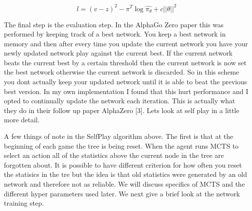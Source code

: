 \begin{equation}
    l = (v - z)^{2} - \pi^{T} \log{\hat{\pi_{\theta}}} + c||\theta||^{2}
\end{equation}

The final step is the evaluation step. In the AlphaGo Zero paper this was performed by keeping track of a best network. You keep a best network in memory and then after every time you update the current network you have your newly updated network play against the current best. If the current network beats the current best by a certain threshold then the current network is now set the best network otherwise the current network is discarded. So in this scheme you dont actually keep your updated network until it is able to beat the previous best version. In my own implementation I found that this hurt performance and I opted to continually update the network each iteration. This is actually what they do in their follow up paper AlphaZero [3]. Lets look at self play in a little more detail. 


\begin{algorithm}[H]
\SetAlgoLined
{}
\end{algorithm}


A few things of note in the SelfPlay algorithm above. The first is that at the beginning of each game the tree is being reset. When the agent runs MCTS to select an action all of the statistics above the current node in the tree are forgotten about. It is possible to have different criterion for how often you reset the statisics in the tre but the idea is that old statistics were generated by an old network and therefore not as reliable. We will discuss specifics of MCTS and the different hyper parameters used later. We next give a brief look at the network training step. 

